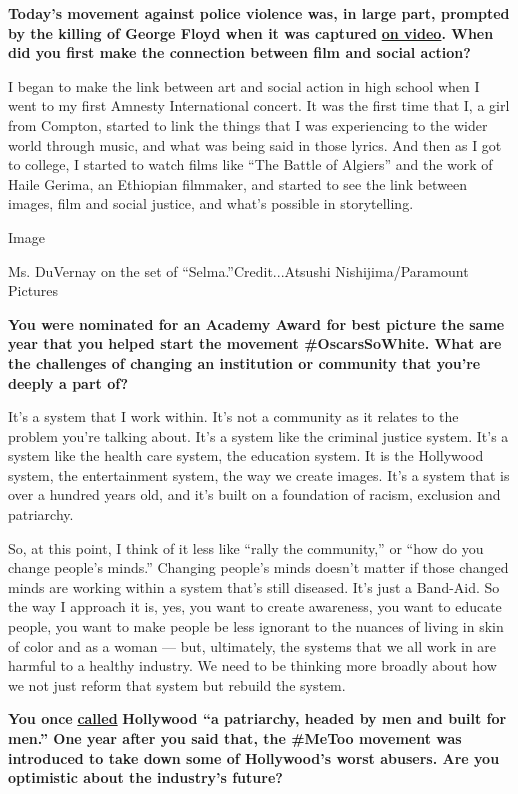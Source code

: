 \textbf{Today's movement against police violence was, in large part,
prompted by the killing of George Floyd when it was captured}
\textbf{\href{https://www.nytimes3xbfgragh.onion/2020/06/03/arts/george-floyd-video-racism.html}{on
video}. When did you first make the connection between film and social
action?}

I began to make the link between art and social action in high school
when I went to my first Amnesty International concert. It was the first
time that I, a girl from Compton, started to link the things that I was
experiencing to the wider world through music, and what was being said
in those lyrics. And then as I got to college, I started to watch films
like ``The Battle of Algiers'' and the work of Haile Gerima, an
Ethiopian filmmaker, and started to see the link between images, film
and social justice, and what's possible in storytelling.

Image

Ms. DuVernay on the set of ``Selma.''Credit...Atsushi
Nishijima/Paramount Pictures

\textbf{You were nominated for an Academy Award for best picture the
same year that you helped start the movement \#OscarsSoWhite. What are
the challenges of changing an institution or community that you're
deeply a part of?}

It's a system that I work within. It's not a community as it relates to
the problem you're talking about. It's a system like the criminal
justice system. It's a system like the health care system, the education
system. It is the Hollywood system, the entertainment system, the way we
create images. It's a system that is over a hundred years old, and it's
built on a foundation of racism, exclusion and patriarchy.

So, at this point, I think of it less like ``rally the community,'' or
``how do you change people's minds.'' Changing people's minds doesn't
matter if those changed minds are working within a system that's still
diseased. It's just a Band-Aid. So the way I approach it is, yes, you
want to create awareness, you want to educate people, you want to make
people be less ignorant to the nuances of living in skin of color and as
a woman --- but, ultimately, the systems that we all work in are harmful
to a healthy industry. We need to be thinking more broadly about how we
not just reform that system but rebuild the system.

\textbf{You once}
\textbf{\href{https://www.glamour.com/story/ava-duvernay-shares-her-advice-for-women}{called}}
\textbf{Hollywood ``a patriarchy, headed by men and built for men.'' One
year after you said that, the \#MeToo movement was introduced to take
down some of Hollywood's worst abusers. Are you optimistic about the
industry's future?}

